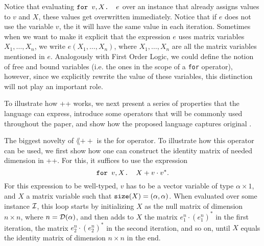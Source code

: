 Notice that evaluating $\texttt{for }v,X \texttt{. }e$ over an instance that already assigns values to $v$ and $X$, these values get overwritten immediately. Notice that if $e$ does not use the variable $v$, the it will have the same value in each iteration. Sometimes when we want to make it explicit that the expression $e$ uses matrix variables $X_1,\ldots ,X_n$, we write $e(X_1,\ldots ,X_n)$, where $X_1,\ldots ,X_n$ are all the matrix variables mentioned in $e$. Analogously with First Order Logic, we could define the notion of free and bound variables (i.e. the ones in the scope of a \texttt{for} operator), however, since we explicitly rewrite the value of these variables, this distinction will not play an important role.






To illustrate how \lang++ works, we next present a series of properties that the language can express, introduce some operators that will be commonly used throughout the paper, and show how the proposed language captures original \lang.

\medskip

The biggest novelty of $\lang++$ is the for operator. To illustrate how this operator can be used, we first show how one can construct the identity matrix of needed dimension in \lang++. For this, it suffices to use the expression $$\texttt{for }v,X \texttt{. }X + v\cdot v^*.$$ For this expression to be well-typed, $v$ has to be a vector variable of type $\alpha\times 1$, and $X$ a matrix variable such that $\texttt{size}(X) = (\alpha,\alpha)$. When evaluated over some instance $\mathcal{I}$, this loop starts by initializing $X$ as the null matrix of dimension $n\times n$, where $n=\mathcal{D}(\alpha)$, and then adds to $X$ the matrix $e_1^n\cdot (e_1^n)^*$ in the first iteration, the matrix $e_2^n\cdot (e_2^n)^*$ in the second iteration, and so on, until $X$ equals the identity matrix of dimension $n\times n$ in the end.

